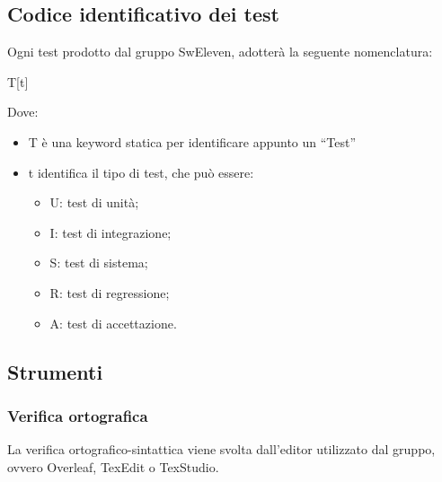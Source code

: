 \subsection{Codice identificativo dei test}
Ogni test prodotto dal gruppo SwEleven, adotterà la seguente nomenclatura:
\begin{center}T[t] \end{center}
Dove:
\begin{itemize}
	\item T è una keyword statica per identificare appunto un “Test”
	\item t identifica il tipo di test, che può essere:
		\begin{itemize}
			\item U: test di unità;
			\item  I: test di integrazione;
			\item S: test di sistema;
			\item R: test di regressione;
			\item A: test di accettazione.
		\end{itemize}
\end{itemize}

\subsection{Strumenti}
\subsubsection{Verifica ortografica}
La verifica ortografico-sintattica viene svolta dall’editor utilizzato dal gruppo, ovvero Overleaf, TexEdit o TexStudio. 




